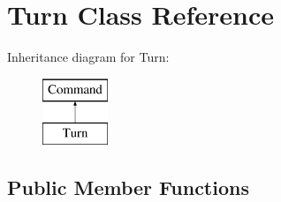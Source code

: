 \hypertarget{classTurn}{\section{Turn Class Reference}
\label{classTurn}
}
Inheritance diagram for Turn\-:\begin{figure}[H]
\begin{center}
\leavevmode
\includegraphics[height=2.000000cm]{classTurn}
\end{center}
\end{figure}
\subsection*{Public Member Functions}

